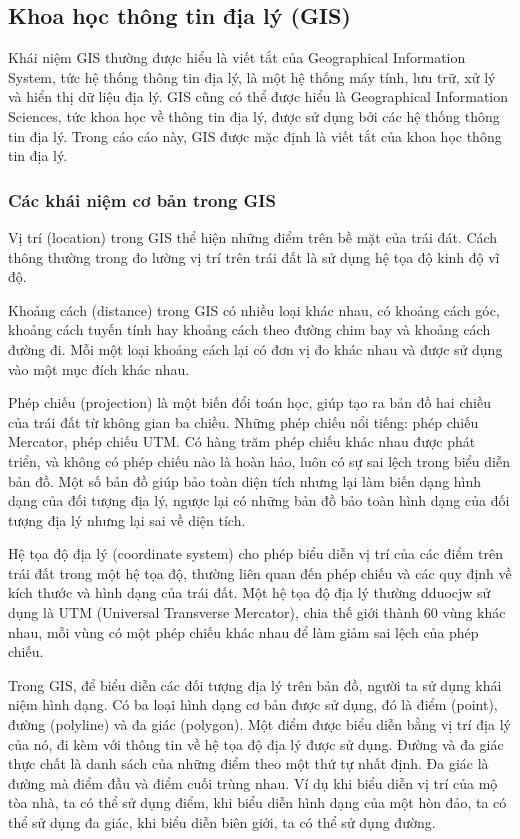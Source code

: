 \documentclass[14pt, oneside, a4paper, openany]{scrartcl}
\begin{document}
\subsection{Khoa học thông tin địa lý (GIS)}
Khái niệm GIS thường được hiểu là viết tắt của Geographical Information System, tức hệ thống thông tin địa lý, là một hệ thống máy tính, lưu trữ, xử lý và hiển thị dữ liệu địa lý.
GIS cũng có thể được hiểu là Geographical Information Sciences, tức khoa học về thông tin địa lý, được sử dụng bởi các hệ thống thông tin địa lý. Trong cáo cáo này, GIS được mặc định là viết tắt của khoa học thông tin địa lý.
\subsubsection{Các khái niệm cơ bản trong GIS}
Vị trí (location) trong GIS thể hiện những điểm trên bề mặt của trái đát. Cách thông thường trong đo lường vị trí trên trái đất là sử dụng hệ tọa độ kinh độ vĩ độ.

Khoảng cách (distance) trong GIS có nhiều loại khác nhau, có khoảng cách góc, khoảng cách tuyến tính hay khoảng cách theo đường chim bay và khoảng cách đường đi. Mỗi một loại khoảng cách lại có đơn vị đo khác nhau và được sử dụng vào một mục đích khác nhau.

Phép chiếu (projection) là một biến đổi toán học, giúp tạo ra bản đồ hai chiều của trái đất từ không gian ba chiều. Những phép chiếu nổi tiếng: phép chiếu Mercator, phép chiếu UTM.
Có hàng trăm phép chiếu khác nhau được phát triển, và không có phép chiếu nào là hoàn hảo, luôn có sự sai lệch trong biểu diễn bản đồ. Một số bản đồ giúp bảo toàn diện tích nhưng lại làm biến dạng hình dạng của đối tượng địa lý, ngược lại có những bản đồ bảo toàn hình dạng của đối tượng địa lý nhưng lại sai về diện tích.

Hệ tọa độ địa lý (coordinate system) cho phép biểu diễn vị trí của các điểm trên trái đất trong một hệ tọa độ, thường liên quan đến phép chiếu và các quy định về kích thước và hình dạng của trái đất. Một hệ tọa độ địa lý thường dduocjw sử dụng là UTM (Universal Transverse Mercator), chia thế giới thành 60 vùng khác nhau, mỗi vùng có một phép chiếu khác nhau để làm giảm sai lệch của phép chiếu.

Trong GIS, để biểu diễn các đối tượng địa lý trên bản đồ, người ta sử dụng khái niệm hình dạng. Có ba loại hình dạng cơ bản được sử dụng, đó là điểm (point), đường (polyline) và đa giác (polygon).
Một điểm được biểu diễn bằng vị trí địa lý của nó, đi kèm với thông tin về hệ tọa độ địa lý được sử dụng.
Đường và đa giác thực chất là danh sách của những điểm theo một thứ tự nhất định.
Đa giác là đường mà điểm đầu và điểm cuối trùng nhau.
Ví dụ khi biểu diễn vị trí của mộ tòa nhà, ta có thể sử dụng điểm, khi biểu diễn hình dạng của một hòn đảo, ta có thể sử dụng đa giác, khi biểu diễn biên giới, ta có thể sử dụng đường.
\end{document}
